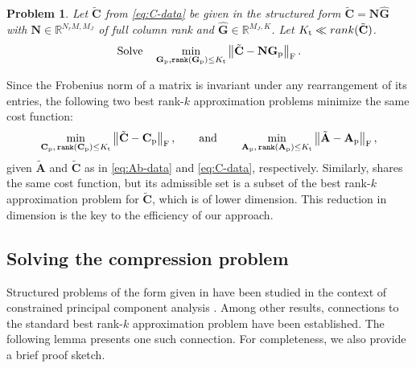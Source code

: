 \documentclass[onefignum,onetabnum]{siamart251104}
\newcommand{\bt}[1]{{\mathbf{#1}}}
\newcommand{\myrank}[1]{{\texttt{rank}\left( {#1}\right)}}
\newcommand{\prol}[1]{{{#1}_{\rm{p}}}} %
\newcommand{\thi}[1]{{{#1}_{\rm{t}}}}	%
\newcommand{\Nr}{{N_r}}
\newcommand{\R}{\mathbb{R}}
\newcommand{\Ap}{{\bt{A}}}
\newcommand{\Cp}{{\bt{C}}}
\newtheorem{prblm}{Problem} %
\begin{document}
\begin{prblm}\label{prob:cpca-C}
Let $\tilde{\Cp}$ from \eqref{eq:C-data} be given in the structured form $\tilde{\Cp} = {\bt{N}} \hat{\bt{G}}$ with $\bt{N} \in \R^{\Nr M, M_J}$ of full column rank and $\hat{\bt{G}}\in \R^{M_J,K}$. Let $\thi{K} \ll rank(\tilde{\Cp})$.
\begin{align*} 
\text{Solve}\quad \min_{ \prol{\bt{G}}, \myrank{\prol{\bt{G}}}  \leq \thi{K}}  \left \| \tilde{\Cp} - \bt{N} \prol{\bt{G}} \right\|_{\rm{F}}.
\end{align*}
\end{prblm}


\begin{rmrk}\label{rem:best-rank-k-equivalence}

Since the Frobenius norm of a matrix is invariant under any rearrangement of its entries, the following two best rank-$k$ approximation problems minimize the same cost function:
\begin{align*}
\min_{\prol{\Cp},\, \myrank{\prol{\Cp}} \leq \thi{K}} \left\| \tilde{\Cp} - \prol{\Cp} \right\|_{\rm F}, 
\qquad \text{and} \qquad
\min_{\prol{\Ap},\, \myrank{\prol{\Ap}} \leq \thi{K}} \left\| \tilde{\Ap} - \prol{\Ap} \right\|_{\rm F},
\end{align*}
given $\tilde{\Ap}$ and $\tilde{\Cp}$ as in \eqref{eq:Ab-data} and \eqref{eq:C-data}, respectively.
Similarly,  shares the same cost function, but its admissible set is a subset of the best rank-$k$ approximation problem for $\tilde{\Cp}$, which is of lower dimension. This reduction in dimension is the key to the efficiency of our approach.
\end{rmrk}

\subsection{Solving the compression problem} \label{subsec:solve-preprocess}
Structured problems of the form given in  have been studied in the context of constrained principal component analysis \cite{art:Takane1991, art:Takane2001}. Among other results, connections to the standard best rank-$k$ approximation problem have been established. The following lemma presents one such connection. For completeness, we also provide a brief proof sketch.
\end{document}
